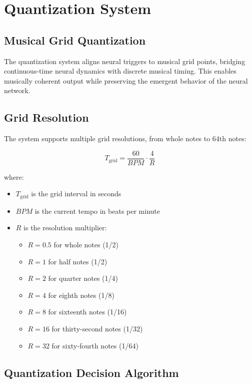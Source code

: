 \documentclass[11pt,a4paper]{article}
\begin{document}
\section{Quantization System}

\subsection{Musical Grid Quantization}

The quantization system aligns neural triggers to musical grid points, bridging continuous-time neural dynamics with discrete musical timing. This enables musically coherent output while preserving the emergent behavior of the neural network.

\subsection{Grid Resolution}

The system supports multiple grid resolutions, from whole notes to 64th notes:

\begin{equation}
T_{\text{grid}} = \frac{60}{BPM} \cdot \frac{4}{R}
\end{equation}

\noindent where:
\begin{itemize}
\item $T_{\text{grid}}$ is the grid interval in seconds
\item $BPM$ is the current tempo in beats per minute
\item $R$ is the resolution multiplier:
  \begin{itemize}
  \item $R=0.5$ for whole notes (1/2)
  \item $R=1$ for half notes (1/2)
  \item $R=2$ for quarter notes (1/4)
  \item $R=4$ for eighth notes (1/8)
  \item $R=8$ for sixteenth notes (1/16)
  \item $R=16$ for thirty-second notes (1/32)
  \item $R=32$ for sixty-fourth notes (1/64)
  \end{itemize}
\end{itemize}

\subsection{Quantization Decision Algorithm}
\end{document}
